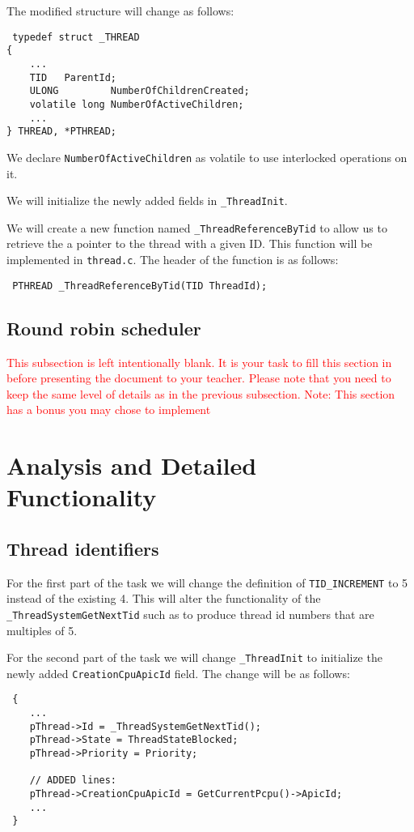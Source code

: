 \documentclass[a4paper,12pt]{report}
\begin{document}
The modified structure will change as follows:
\begin{lstlisting}
 typedef struct _THREAD
{
    ...
    TID   ParentId;
    ULONG         NumberOfChildrenCreated;
    volatile long NumberOfActiveChildren;
    ...
} THREAD, *PTHREAD;
\end{lstlisting}

We declare \lstinline{NumberOfActiveChildren} as volatile to use interlocked operations on it. 


We will initialize the newly added fields in \lstinline|_ThreadInit|. 

We will create a new function named \lstinline|_ThreadReferenceByTid| to allow us to retrieve the a pointer to the thread with a given ID. This function will be implemented in \lstinline|thread.c|. The header of the function is as follows:
\begin{lstlisting}
 PTHREAD _ThreadReferenceByTid(TID ThreadId);
\end{lstlisting}

\subsection{Round robin scheduler}
  \textcolor{red}{This subsection is left intentionally blank. It is your task to fill this section in before presenting the document to your teacher. Please note that you need to keep the same level of details as in the previous subsection. Note: This section has a bonus you may chose to implement}
  
\section{Analysis and Detailed Functionality}
\subsection{Thread identifiers}

For the first part of the task we will change the definition of \lstinline|TID_INCREMENT| to 5 instead of the existing 4. This will alter the functionality of the \lstinline|_ThreadSystemGetNextTid| such as to produce thread id numbers that are multiples of 5. 

For the second part of the task we will change \lstinline{_ThreadInit} to initialize the newly added \lstinline|CreationCpuApicId| field. The change will be as follows:

\begin{lstlisting}
 {
    ...
    pThread->Id = _ThreadSystemGetNextTid();
    pThread->State = ThreadStateBlocked;
    pThread->Priority = Priority;
    
    // ADDED lines:
    pThread->CreationCpuApicId = GetCurrentPcpu()->ApicId;
    ...
 }
\end{lstlisting}
\end{document}
